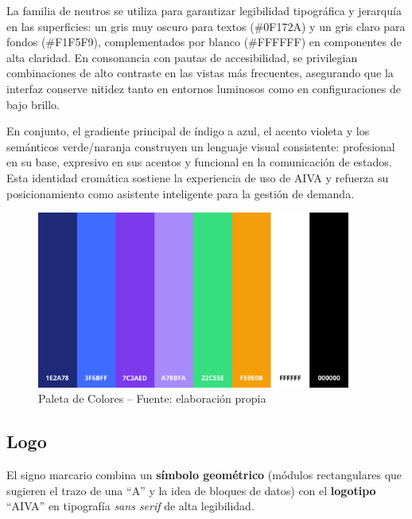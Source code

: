 La familia de neutros se utiliza para garantizar legibilidad tipográfica y jerarquía en las superficies: un gris muy oscuro para textos (\#0F172A) y un gris claro para fondos (\#F1F5F9), complementados por blanco (\#FFFFFF) en componentes de alta claridad. En consonancia con pautas de accesibilidad, se privilegian combinaciones de alto contraste en las vistas más frecuentes, asegurando que la interfaz conserve nitidez tanto en entornos luminosos como en configuraciones de bajo brillo.

En conjunto, el gradiente principal de índigo a azul, el acento violeta y los semánticos verde/naranja construyen un lenguaje visual consistente: profesional en su base, expresivo en sus acentos y funcional en la comunicación de estados. Esta identidad cromática sostiene la experiencia de uso de AIVA y refuerza su posicionamiento como asistente inteligente para la gestión de demanda.

\begin{figure}[!htbp]
  \centering
  \includegraphics[width=0.92\textwidth]{images/paleta-aiva.png}
  \caption{Paleta de Colores -- Fuente: elaboración propia}
  \label{fig:paleta-aiva}
\end{figure}

\subsection{Logo}
El signo marcario combina un \textbf{símbolo geométrico} (módulos rectangulares que sugieren el trazo de una “A” y la idea de bloques de datos) con el \textbf{logotipo} “AIVA” en tipografía \textit{sans serif} de alta legibilidad.

